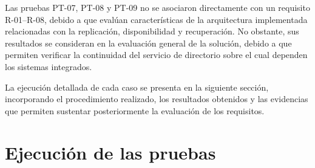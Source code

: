 Las pruebas PT-07, PT-08 y PT-09 no se asociaron directamente con un requisito R-01--R-08, debido a que evalúan características de la arquitectura implementada relacionadas con la replicación, disponibilidad y recuperación. No obstante, sus resultados se consideran en la evaluación general de la solución, debido a que permiten verificar la continuidad del servicio de directorio sobre el cual dependen los sistemas integrados.

La ejecución detallada de cada caso se presenta en la siguiente sección, incorporando el procedimiento realizado, los resultados obtenidos y las evidencias que permiten sustentar posteriormente la evaluación de los requisitos.

\section{Ejecución de las pruebas}\label{sec:ejecucion-pruebas}

